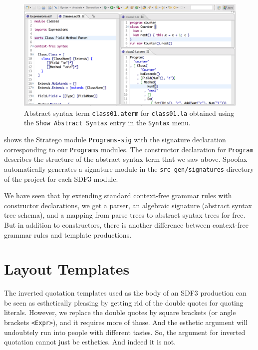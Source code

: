 \begin{figure}[t]
\includegraphics[width=\hsize]{syntax/class01-abstract-syntax.pdf}
\caption{Abstract syntax term \texttt{class01.aterm} for \texttt{class01.la}
obtained using the \texttt{Show Abstract Syntax} entry in the \texttt{Syntax}
menu.}
\end{figure}
 
 shows the Stratego module \texttt{Programs-sig}
with the signature declaration corresponding to our \texttt{Programs} modules.
The constructor declaration for \texttt{Program} describes the structure of the
abstract syntax term that we saw above. Spoofax automatically generates a
signature module in the \texttt{src-gen/signatures} directory of the project for
each SDF3 module.

We have seen that by extending standard context-free grammar rules with
constructor declarations, we get a parser, an algebraic signature (abstract
syntax tree schema), and a mapping from parse trees to abstract syntax trees for
free. But in addition to constructors, there is another difference between
context-free grammar rules and template productions.

\section{Layout Templates}

The inverted quotation templates used as the body of an SDF3 production can be
seen as esthetically pleasing by getting rid of the double quotes for quoting
literals. However, we replace the double quotes by square brackets (or angle
brackets \texttt{<Expr>}), and it requires more of those. And the esthetic
argument will undoubtely run into people with different tastes. So, the argument
for inverted quotation cannot just be esthetics. And indeed it is not.

